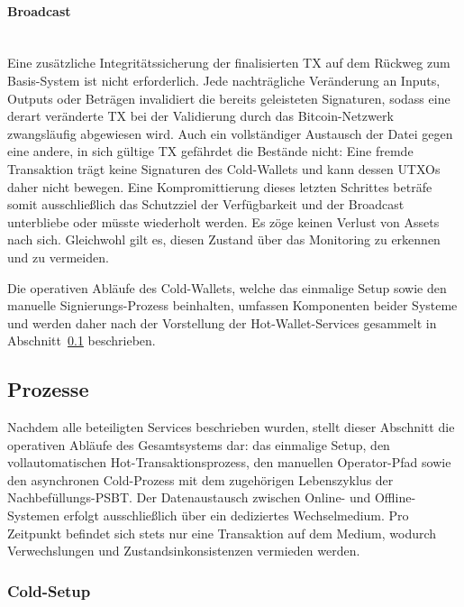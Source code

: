 \paragraph{Broadcast} \mbox{}\\
Eine zusätzliche Integritätssicherung der finalisierten \ac{TX} auf dem Rückweg zum Basis-System ist nicht erforderlich. Jede nachträgliche Veränderung an Inputs, Outputs oder Beträgen invalidiert die bereits geleisteten Signaturen, sodass eine derart veränderte \ac{TX} bei der Validierung durch das Bitcoin-Netzwerk zwangsläufig abgewiesen wird. 
Auch ein vollständiger Austausch der Datei gegen eine andere, in sich gültige
\ac{TX} gefährdet die Bestände nicht: Eine fremde Transaktion trägt keine Signaturen des Cold-Wallets und kann dessen \acp{UTXO} daher nicht bewegen.
Eine Kompromittierung dieses letzten Schrittes beträfe somit ausschließlich das Schutzziel der Verfügbarkeit und der Broadcast unterbliebe oder müsste
wiederholt werden. Es zöge keinen Verlust von Assets nach sich. Gleichwohl gilt es, diesen Zustand über das Monitoring zu erkennen und zu vermeiden.

Die operativen Abläufe des Cold-Wallets, welche das einmalige Setup sowie den manuelle Signierungs-Prozess beinhalten, umfassen Komponenten beider Systeme und werden daher nach der Vorstellung der Hot-Wallet-Services gesammelt in Abschnitt~\ref{sec:prozesse} beschrieben.





\subsection{Prozesse} \label{sec:prozesse}

Nachdem alle beteiligten Services beschrieben wurden, stellt dieser Abschnitt die operativen Abläufe des Gesamtsystems dar: das einmalige Setup, den vollautomatischen Hot-Transaktionsprozess, den manuellen Operator-Pfad sowie den asynchronen Cold-Prozess mit dem zugehörigen Lebenszyklus der
Nachbefüllungs-\ac{PSBT}. 
Der Datenaustausch zwischen Online- und Offline-Systemen erfolgt ausschließlich über ein dediziertes Wechselmedium. Pro Zeitpunkt befindet sich stets nur eine Transaktion auf dem Medium, wodurch Verwechslungen und Zustandsinkonsistenzen vermieden werden.


\subsubsection{Cold-Setup} \label{sec:cold_setup}

